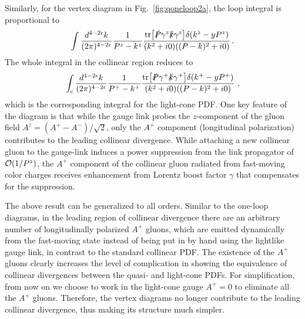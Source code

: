 Similarly, for the vertex diagram in Fig.~\ref{fig:qoneloop2a}, the loop integral is proportional to
\begin{align}
	\int \frac{d^{4-2\epsilon}k}{(2\pi)^{4-2\epsilon}}\frac{1}{P^z-k^z}\frac{{\rm tr}\big[ \slashed{P} \gamma^z \slashed{k} \gamma^z\big] \delta(k^z-yP^z)}{(k^2+i0)((P-k)^2+i0)} \,.
\end{align}
The whole integral in the collinear region reduces to
\begin{align}
	\int_{\rm c} \frac{d^{4-2\epsilon}k}{(2\pi)^{4-2\epsilon}}\frac{1}{P^+-k^+}\frac{{\rm tr} \big[\slashed{P} \gamma^+ \slashed{k} \gamma^+\big]\delta(k^+-yP^+)}{(k^2+i0)((P-k)^2+i0)}  \ ,
\end{align}
which is the corresponding integral for the light-cone PDF. One key feature of the diagram is that while the gauge link probes the $z$-component of the gluon field $A^z =\left(A^+-A^-\right)/\sqrt{2}$, only the $A^+$ component (longitudinal polarization) contributes to the leading collinear divergence. While attaching a new collinear gluon to the gauge-link induces a power suppression from the link propagator of ${\cal O}(1/P^z)$, the $A^+$ component of the collinear gluon radiated from fast-moving color charges receives enhancement from Lorentz boost factor $\gamma$ that compensates for the suppression.

The above result can be generalized to all orders. Similar to the one-loop diagrams, in the leading region of collinear divergence there are an arbitrary number of longitudinally polarized $A^+$ gluons, which are emitted dynamically from the fast-moving state instead of being put in by hand using the lightlike gauge link, in contrast to the standard collinear PDF. The existence of the $A^+$ gluons clearly increases
the level of complication in showing the equivalence of collinear divergences between the quasi- and light-cone PDFs. For simplification, from now on we choose to work in the light-cone gauge $A^+=0$ to eliminate all the $A^+$ gluons. Therefore, the vertex diagrams
no longer contribute to the leading collinear divergence, thus making its structure much simpler.

